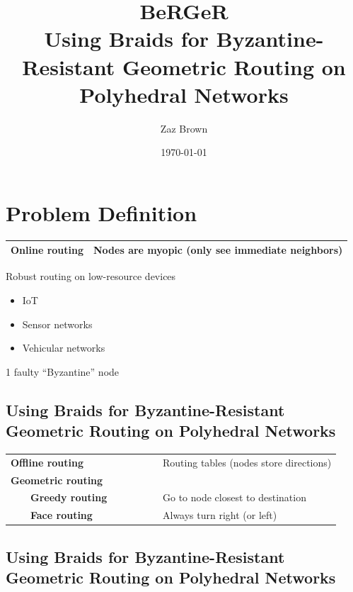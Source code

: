 \documentclass[11pt]{article}
\author{Zaz Brown}
\date{\today}
\title{BeRGeR\\\medskip
\large Using Braids for Byzantine-Resistant Geometric Routing on Polyhedral Networks}
\begin{document}
\maketitle
\setcounter{tocdepth}{1}
\tableofcontents

\section*{Problem Definition}
\label{sec:orgd417a7b}

\begin{center}
\begin{tabular}{ll}
\hline
\textbf{Online routing} & Nodes are \textbf{myopic} (only see immediate neighbors)\\[0pt]
\hline
\end{tabular}
\end{center}

Robust routing on low-resource devices

\begin{itemize}
\item IoT
\item Sensor networks
\item Vehicular networks
\end{itemize}

1 faulty ``Byzantine'' node
\subsection*{Using Braids for Byzantine-Resistant \textbf{Geometric Routing} on Polyhedral Networks}
\label{sec:org0ca37ca}

\begin{center}
\begin{tabular}{ll}
\hline
\textbf{Offline routing}                & Routing tables (nodes store directions)\\[0pt]
\textbf{Geometric routing} & \\[0pt]
    \textbf{Greedy routing} & Go to node closest to destination\\[0pt]
    \textbf{Face routing} & Always turn right (or left)\\[0pt]
\hline
\end{tabular}
\end{center}
\subsection*{Using Braids for \textbf{Byzantine-Resistant} Geometric Routing on Polyhedral Networks}
\label{sec:org17b0a74}
\end{document}
